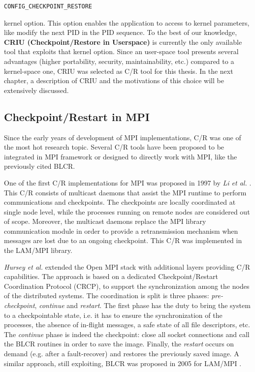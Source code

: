 
\lstset{%
}%
\begin{lstlisting}[style=customkernelopt]
CONFIG_CHECKPOINT_RESTORE
\end{lstlisting}

kernel option. This option enables
the application to access to kernel parameters, like modify the next PID in the
PID sequence. To the best of our knowledge, \textbf{CRIU (Checkpoint/Restore
in Userspace)} \cite{CRIU} is currently the only available tool that exploits
that kernel option. Since an user-space tool presents several advantages
(higher portability, security, maintainability, etc.) compared to a kernel-space one, CRIU was selected as C/R
tool for this thesis.
In the next chapter, a description of CRIU and the motivations of this choice
will be extensively discussed.

\subsection{Checkpoint/Restart in MPI}
Since the early years of development of MPI implementations, C/R was one of
the most hot research topic. Several C/R tools have been proposed to
be integrated in MPI framework or designed to directly work with MPI, like the
previously cited BLCR.

One of the first C/R implementations for MPI was proposed in 1997 by
\emph{Li et al.}
\cite{li1997checkpointing}. This C/R consists of multicast daemons that
assist the MPI runtime to perform communications and checkpoints. The
checkpoints are locally coordinated at single node level, while the processes
running on remote nodes are considered out of scope. Moreover, the multicast
daemons replace the MPI library communication module
in order to provide a retransmission mechanism
when messages are lost due to an ongoing checkpoint. This C/R was implemented
in the LAM/MPI library.

\emph{Hursey et al.} \cite{hursey2009interconnect} extended the Open MPI
stack with additional layers providing C/R capabilities. The approach is
based on a dedicated Checkpoint/Restart Coordination Protocol (CRCP), to
support the synchronization among the nodes of the distributed systems. The
coordination is split
is three phases: \linebreak \emph{pre-checkpoint}, \emph{continue} and \emph{restart}.
The first phase has the duty to bring the system to a checkpointable state,
i.e. it has to ensure the synchronization of the processes, the absence of
in-flight messages, a safe state of all file descriptors, etc. The
\emph{continue} phase is indeed the checkpoint: close all socket connections
and call the
BLCR routines in order to save the image. Finally, the \emph{restart} occurs
on demand (e.g. after a fault-recover) and restores the previously saved
image. A similar approach, still exploiting, BLCR was proposed in 2005
for LAM/MPI \cite{sankaran2005lam}.

